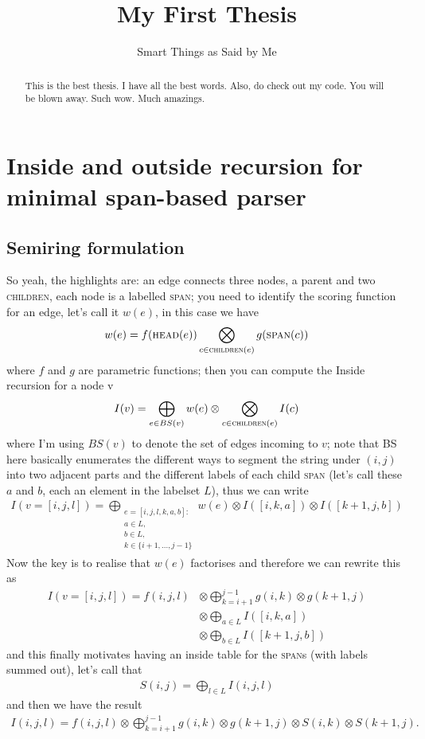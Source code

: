 \documentclass[examplefnt,biber]{nowfnt} %
\title{My First Thesis}
\subtitle{Smart Things as Said by Me}
\begin{document}
\makeabstracttitle

\begin{abstract}
This is the best thesis. I have all the best words. Also, do check out my code. You will be blown away. Such wow. Much amazings.

\end{abstract}

\chapter{Inside and outside recursion for minimal span-based parser}
\label{c-intro} %

\section{Semiring formulation}
So yeah, the highlights are: an edge connects three nodes, a parent and two \textsc{children}, each node is a labelled \textsc{span}; you need to identify the scoring function for an edge, let’s call it $w(e)$,  in this case we have
\begin{align}
    w(e) = f(\textsc{head}(e)) \bigotimes_{c \in \textsc{children}(e)} g(\textsc{span}(c))
\end{align}
where $f$ and $g$ are parametric functions; then you can compute the Inside recursion for a node v
\begin{align}
    I(v) = \bigoplus_{e \in BS(v)} w(e) \otimes \bigotimes_{c \in \textsc{children}(e)} I(c)
\end{align}
where I’m using $BS(v)$ to denote the set of edges incoming to $v$; note that BS here basically enumerates the different ways to segment the string under $(i,j)$ into two adjacent parts and the different labels of each child \textsc{span} (let’s call these $a$ and $b$, each an element in the labelset $L$), thus we can write
\begin{align}
I(v=[i,j,l]) = \bigoplus_{ \substack{ e=[i,j,l,k,a,b]: \\ a \in L, \\ b \in L, \\ k \in \{i+1,...,j-1\} } } w(e) \otimes I([i,k,a]) \otimes I([k+1,j,b])
\end{align}
Now the key is to realise that $w(e)$ factorises and therefore we can rewrite this as
\begin{align}
    I(v=[i,j,l]) = f(i,j,l) &\otimes \bigoplus_{k=i+1}^{j-1} g(i,k) \otimes g(k+1,j) \\
        &\otimes \bigoplus_{a \in L}  I([i,k,a]) \\
        &\otimes \bigoplus_{b\in L} I([k+1,j,b])
\end{align}
and this finally motivates having an inside table for the \textsc{span}s (with labels summed out), let’s call that
\begin{align}
    S(i,j) = \bigoplus_{l \in L} I(i,j,l)
\end{align}
and then we have the result
\begin{align}
\label{eq:inside-semiring}
    I(i,j,l) = f(i,j,l)\otimes \bigoplus_{k=i+1}^{j-1} g(i,k)\otimes g(k+1,j) \otimes S(i,k) \otimes S(k+1,j).
\end{align}
\end{document}
